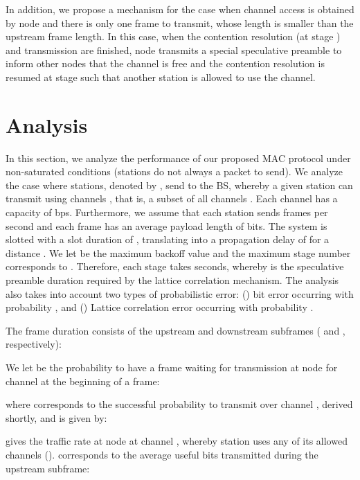 \documentclass[journal,10pt,draftclsnofoot,onecolumn]{IEEEtran}
\begin{document}
In addition, we propose a mechanism for the case when channel access is obtained by node  and there is only one frame to transmit, whose length is smaller than the upstream frame length. In this case, when the contention resolution (at stage ) and transmission are finished, node  transmits a special speculative preamble to inform other nodes that the channel is free and the contention resolution is resumed at stage  such that another station is allowed to use the channel.

\section{Analysis}
\label{sec:analysis}
In this section, we analyze the performance of our proposed MAC protocol under non-saturated conditions (stations do not always a packet to send). We analyze the case where stations, denoted by , send to the BS, whereby a given station  can transmit using channels , that is, a subset of all channels . Each channel has a capacity of  bps. Furthermore, we assume that each station  sends  frames per second and each frame has an average payload length of  bits. The system is slotted with a slot duration of , translating into a propagation delay of  for a distance . We let  be the maximum backoff value and the maximum stage number corresponds to . Therefore, each stage takes  seconds, whereby  is the speculative preamble duration required by the lattice correlation mechanism. The analysis also takes into account two types of probabilistic error: () bit error occurring with probability , and () Lattice correlation error occurring with probability .

The frame duration consists of the upstream and downstream subframes ( and , respectively):



We let  be the probability to have a frame waiting for transmission at node  for channel  at the beginning of a frame:














where  corresponds to the successful probability to transmit over channel , derived shortly, and  is given by:


 gives the traffic rate at node  at channel , whereby station  uses any of its allowed channels ().  corresponds to the average useful bits transmitted during the upstream subframe:
	
\end{document}
